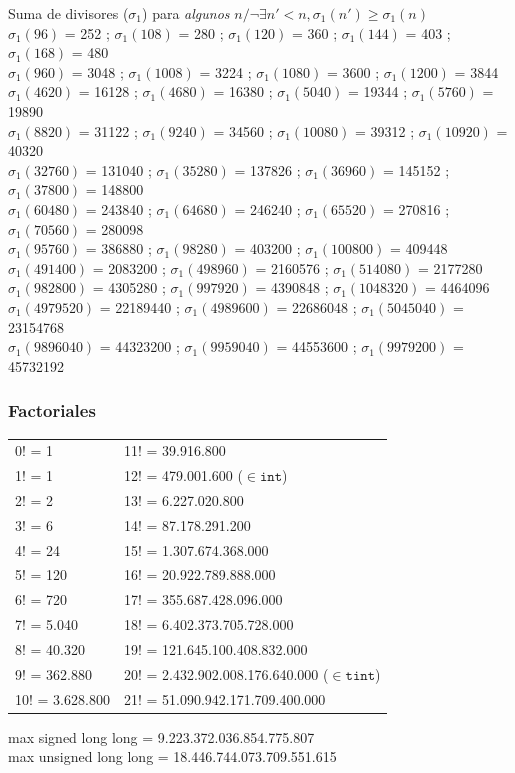 %
Suma de divisores ($\sigma_1$) para \emph{algunos} $n / \neg\exists n'<n, \sigma_1(n') \geqslant \sigma_1(n)$ \\
$\sigma_1(96)$ = 252 ; $\sigma_1(108)$ = 280 ; $\sigma_1(120)$ = 360 ; $\sigma_1(144)$ = 403 ; $\sigma_1(168)$ = 480 \\
$\sigma_1(960)$ = 3048 ; $\sigma_1(1008)$ = 3224 ; $\sigma_1(1080)$ = 3600 ; $\sigma_1(1200)$ = 3844 \\
$\sigma_1(4620)$ = 16128 ; $\sigma_1(4680)$ = 16380 ; $\sigma_1(5040)$ = 19344 ; $\sigma_1(5760)$ = 19890 \\
$\sigma_1(8820)$ = 31122 ; $\sigma_1(9240)$ = 34560 ; $\sigma_1(10080)$ = 39312 ; $\sigma_1(10920)$ = 40320 \\
$\sigma_1(32760)$ = 131040 ; $\sigma_1(35280)$ = 137826 ; $\sigma_1(36960)$ = 145152 ; $\sigma_1(37800)$ = 148800 \\
$\sigma_1(60480)$ = 243840 ; $\sigma_1(64680)$ = 246240 ; $\sigma_1(65520)$ = 270816 ; $\sigma_1(70560)$ = 280098 \\
$\sigma_1(95760)$ = 386880 ; $\sigma_1(98280)$ = 403200 ; $\sigma_1(100800)$ = 409448  \\
$\sigma_1(491400)$ = 2083200 ; $\sigma_1(498960)$ = 2160576 ; $\sigma_1(514080)$ = 2177280 \\
$\sigma_1(982800)$ = 4305280 ; $\sigma_1(997920)$ = 4390848 ; $\sigma_1(1048320)$ = 4464096 \\
$\sigma_1(4979520)$ = 22189440 ; $\sigma_1(4989600)$ = 22686048 ; $\sigma_1(5045040)$ = 23154768 \\
$\sigma_1(9896040)$ = 44323200 ; $\sigma_1(9959040)$ = 44553600 ; $\sigma_1(9979200)$ = 45732192
%
%
\subsubsection{Factoriales}
\begin{tabular}{l|l}
0! =	1             & 11! = 39.916.800  \\
1! =	1             & 12! =	479.001.600	($\in \mathtt{int}$)\\
2! =	2             & 13! =	6.227.020.800	\\
3! =	6             & 14! =	87.178.291.200	\\
4! =	24            & 15! =	1.307.674.368.000	\\
5! =	120   			  & 16! =	20.922.789.888.000	\\
6! =	720           & 17! =	355.687.428.096.000	\\
7! =	5.040	        & 18! =	6.402.373.705.728.000	\\
8! =	40.320	      & 19! =	121.645.100.408.832.000	\\
9! =	362.880       & 20! =	2.432.902.008.176.640.000	($\in \mathtt{tint}$) \\
10! =	3.628.800     & 21! =	51.090.942.171.709.400.000
\end{tabular}

max signed long long = 9.223.372.036.854.775.807 \\
max unsigned long long = 18.446.744.073.709.551.615